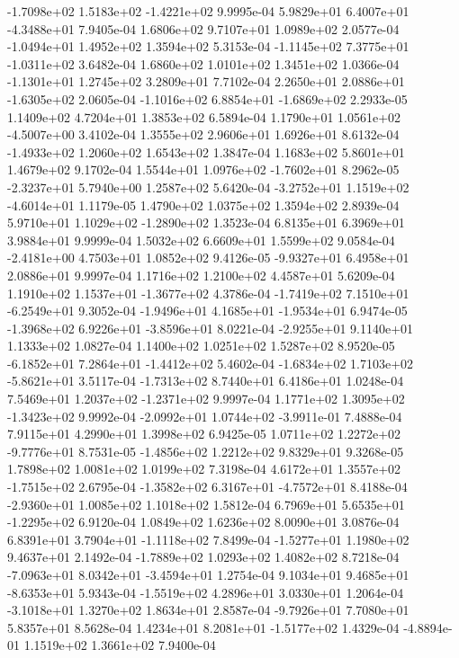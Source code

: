 -1.7098e+02  1.5183e+02 -1.4221e+02  9.9995e-04
 5.9829e+01  6.4007e+01 -4.3488e+01  7.9405e-04
1.6806e+02 9.7107e+01 1.0989e+02  2.0577e-04
-1.0494e+01  1.4952e+02  1.3594e+02  5.3153e-04
-1.1145e+02  7.3775e+01 -1.0311e+02  3.6482e-04
1.6860e+02 1.0101e+02 1.3451e+02  1.0366e-04
-1.1301e+01  1.2745e+02  3.2809e+01  7.7102e-04
 2.2650e+01  2.0886e+01 -1.6305e+02  2.0605e-04
-1.1016e+02  6.8854e+01 -1.6869e+02  2.2933e-05
1.1409e+02 4.7204e+01 1.3853e+02  6.5894e-04
 1.1790e+01  1.0561e+02 -4.5007e+00  3.4102e-04
1.3555e+02 2.9606e+01 1.6926e+01  8.6132e-04
-1.4933e+02  1.2060e+02  1.6543e+02  1.3847e-04
1.1683e+02 5.8601e+01 1.4679e+02  9.1702e-04
 1.5544e+01  1.0976e+02 -1.7602e+01  8.2962e-05
-2.3237e+01  5.7940e+00  1.2587e+02  5.6420e-04
-3.2752e+01  1.1519e+02 -4.6014e+01  1.1179e-05
1.4790e+02 1.0375e+02 1.3594e+02  2.8939e-04
 5.9710e+01  1.1029e+02 -1.2890e+02  1.3523e-04
6.8135e+01 6.3969e+01 3.9884e+01  9.9999e-04
1.5032e+02 6.6609e+01 1.5599e+02  9.0584e-04
-2.4181e+00  4.7503e+01  1.0852e+02  9.4126e-05
-9.9327e+01  6.4958e+01  2.0886e+01  9.9997e-04
1.1716e+02 1.2100e+02 4.4587e+01  5.6209e-04
 1.1910e+02  1.1537e+01 -1.3677e+02  4.3786e-04
-1.7419e+02  7.1510e+01 -6.2549e+01  9.3052e-04
-1.9496e+01  4.1685e+01 -1.9534e+01  6.9474e-05
-1.3968e+02  6.9226e+01 -3.8596e+01  8.0221e-04
-2.9255e+01  9.1140e+01  1.1333e+02  1.0827e-04
1.1400e+02 1.0251e+02 1.5287e+02  8.9520e-05
-6.1852e+01  7.2864e+01 -1.4412e+02  5.4602e-04
-1.6834e+02  1.7103e+02 -5.8621e+01  3.5117e-04
-1.7313e+02  8.7440e+01  6.4186e+01  1.0248e-04
 7.5469e+01  1.2037e+02 -1.2371e+02  9.9997e-04
 1.1771e+02  1.3095e+02 -1.3423e+02  9.9992e-04
-2.0992e+01  1.0744e+02 -3.9911e-01  7.4888e-04
7.9115e+01 4.2990e+01 1.3998e+02  6.9425e-05
 1.0711e+02  1.2272e+02 -9.7776e+01  8.7531e-05
-1.4856e+02  1.2212e+02  9.8329e+01  9.3268e-05
1.7898e+02 1.0081e+02 1.0199e+02  7.3198e-04
 4.6172e+01  1.3557e+02 -1.7515e+02  2.6795e-04
-1.3582e+02  6.3167e+01 -4.7572e+01  8.4188e-04
-2.9360e+01  1.0085e+02  1.1018e+02  1.5812e-04
 6.7969e+01  5.6535e+01 -1.2295e+02  6.9120e-04
1.0849e+02 1.6236e+02 8.0090e+01  3.0876e-04
 6.8391e+01  3.7904e+01 -1.1118e+02  7.8499e-04
-1.5277e+01  1.1980e+02  9.4637e+01  2.1492e-04
-1.7889e+02  1.0293e+02  1.4082e+02  8.7218e-04
-7.0963e+01  8.0342e+01 -3.4594e+01  1.2754e-04
 9.1034e+01  9.4685e+01 -8.6353e+01  5.9343e-04
-1.5519e+02  4.2896e+01  3.0330e+01  1.2064e-04
-3.1018e+01  1.3270e+02  1.8634e+01  2.8587e-04
-9.7926e+01  7.7080e+01  5.8357e+01  8.5628e-04
 1.4234e+01  8.2081e+01 -1.5177e+02  1.4329e-04
-4.8894e-01  1.1519e+02  1.3661e+02  7.9400e-04
